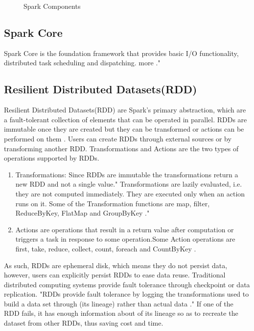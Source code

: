 \documentclass[9pt,twocolumn,twoside]{styles/osajnl}
\begin{document}
\begin{figure}[htbp]
\centering
{}
\caption{Spark Components \cite{book-spark}}
\label{fig:spark-stack}
\end{figure}

\subsection{Spark Core}

Spark Core is the foundation framework that provides basic I/O functionality, distributed task scheduling and dispatching.
more \cite{article-spark-1}." 
\subsection{Resilient Distributed Datasets(RDD)}
Resilient Distributed Datasets(RDD) \cite{paper-RDD} are Spark's
primary abstraction, which are a fault-tolerant collection of elements that can be operated in parallel. RDDs are immutable once they are created but they can be transformed or actions can be performed on them \cite{article-spark-1}. Users can create RDDs through external sources or by transforming another RDD. Transformations and Actions are the two
types of operations supported by RDDs.
\begin{enumerate}
\item Transformations: Since RDDs are immutable the transformations return a new RDD and not a single value." Transformations are lazily evaluated, i.e. they are not computed immediately. They are executed
only when an action runs on it. Some of the Transformation functions are map, filter, ReduceByKey, FlatMap and GroupByKey \cite{article-spark-1}."
\item Actions are operations that result in a return
value after computation or triggers a task in response to some
operation.Some Action operations are first, take, reduce,
collect, count, foreach and CountByKey \cite{article-spark-1}.
\end{enumerate}
As such, RDDs are ephemeral disk, which means they do not persist
data, however, users can explicitly persist RDDs to ease data
reuse. Traditional distributed computing systems provide fault
tolerance through checkpoint or data replication. "RDDs provide fault
tolerance by logging the transformations used to build a data set
through (its lineage) rather than actual data \cite{paper-RDD}." If one of the RDD fails, it has enough information about of its lineage so as to recreate the dataset from other RDDs, thus saving cost and time.
\end{document}
